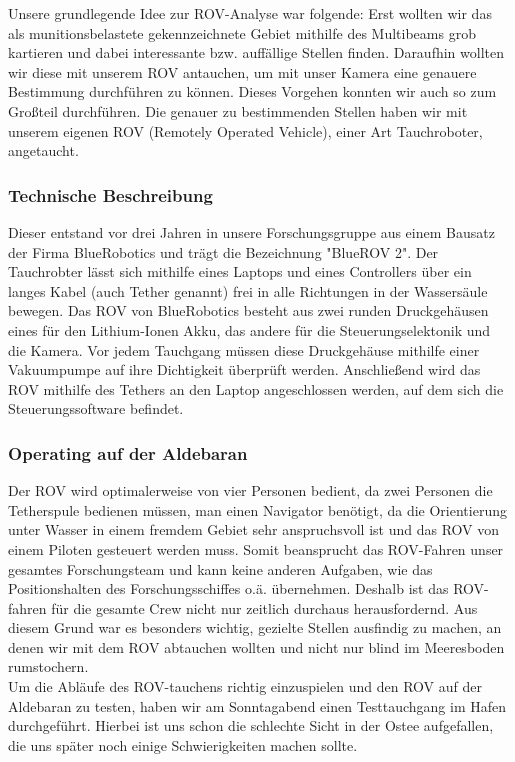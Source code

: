 
Unsere grundlegende Idee zur ROV-Analyse war folgende: Erst wollten wir das als munitionsbelastete gekennzeichnete Gebiet mithilfe 
des Multibeams grob kartieren und dabei 
interessante bzw. auffällige Stellen finden. Daraufhin wollten wir diese mit unserem ROV antauchen, um mit unser Kamera eine genauere Bestimmung durchführen zu können. 
Dieses Vorgehen konnten wir auch so zum Großteil durchführen.
Die genauer zu bestimmenden Stellen haben wir mit unserem eigenen ROV (Remotely Operated Vehicle), einer Art Tauchroboter, angetaucht. 
\subsubsection{Technische Beschreibung}
Dieser entstand vor drei Jahren in unsere Forschungsgruppe aus einem Bausatz der Firma BlueRobotics und trägt die Bezeichnung "BlueROV 2".
Der Tauchrobter lässt sich mithilfe eines Laptops und eines Controllers über ein langes Kabel (auch Tether genannt) frei in alle Richtungen in der Wassersäule bewegen.
Das ROV von BlueRobotics besteht aus zwei runden Druckgehäusen eines für den Lithium-Ionen Akku, das andere für die Steuerungselektonik und die Kamera.
Vor jedem Tauchgang müssen diese Druckgehäuse mithilfe einer Vakuumpumpe auf ihre Dichtigkeit überprüft werden. 
Anschließend wird das ROV mithilfe des Tethers an den Laptop angeschlossen werden, auf dem sich die Steuerungssoftware befindet.
\subsubsection{Operating auf der Aldebaran}
Der ROV wird optimalerweise 
von vier Personen bedient, da zwei Personen die Tetherspule bedienen müssen, man einen Navigator benötigt, da die Orientierung unter Wasser in einem fremdem Gebiet sehr anspruchsvoll ist und das ROV von einem Piloten gesteuert werden muss.
Somit beansprucht das ROV-Fahren unser gesamtes Forschungsteam und kann keine anderen Aufgaben, wie das Positionshalten des Forschungsschiffes o.ä. übernehmen. Deshalb ist das ROV-fahren für die gesamte Crew nicht nur zeitlich durchaus herausfordernd.
Aus diesem Grund war es besonders wichtig, gezielte Stellen ausfindig zu machen, an denen wir mit dem ROV abtauchen wollten und nicht nur blind im Meeresboden rumstochern.
\\

Um die Abläufe des ROV-tauchens richtig einzuspielen und den ROV auf der Aldebaran zu testen, haben wir am Sonntagabend einen Testtauchgang im Hafen durchgeführt. 
Hierbei ist uns schon die schlechte Sicht in der Ostee aufgefallen, die uns später noch einige Schwierigkeiten machen sollte.
\\

